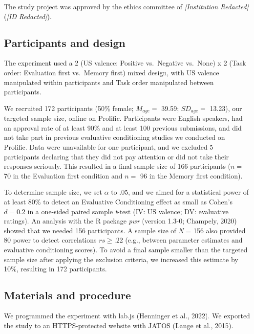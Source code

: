 \documentclass[
  man,floatsintext]{apa6}
\begin{document}
The study project was approved by the ethics committee of \emph{{[}Institution Redacted{]}} (\emph{{[}ID Redacted{]}}).

\hypertarget{participants-and-design}{%
\subsection{Participants and design}\label{participants-and-design}}

The experiment used a 2 (US valence: Positive vs.~Negative vs.~None) x 2 (Task order: Evaluation first vs.~Memory first) mixed design, with US valence manipulated within participants and Task order manipulated between participants.

We recruited 172 participants (50\(\%\) female; \(M_{age} =\) 39.59; \(SD_{age} =\) 13.23), our targeted sample size, online on Prolific. Participants were English speakers, had an approval rate of at least 90\% and at least 100 previous submissions, and did not take part in previous evaluative conditioning studies we conducted on Prolific. Data were unavailable for one participant, and we excluded 5 participants declaring that they did not pay attention or did not take their responses seriously. This resulted in a final sample size of 166 participants (\(n =\) 70 in the Evaluation first condition and \(n =\) 96 in the Memory first condition).

To determine sample size, we set \(\alpha\) to .05, and we aimed for a statistical power of at least \(80\%\) to detect an Evaluative Conditioning effect as small as Cohen's \(d = 0.2\) in a one-sided paired sample \emph{t}-test (IV: US valence; DV: evaluative ratings). An analysis with the R package \emph{pwr} (version 1.3-0; Champely, 2020) showed that we needed 156 participants. A sample size of \emph{N} = 156 also provided \(80%
\) power to detect correlations \(rs \geq .22\) (e.g., between parameter estimates and evaluative conditioning scores). To avoid a final sample smaller than the targeted sample size after applying the exclusion criteria, we increased this estimate by 10\%, resulting in 172 participants.

\hypertarget{materials-and-procedure}{%
\subsection{Materials and procedure}\label{materials-and-procedure}}

We programmed the experiment with lab.js (Henninger et al., 2022). We exported the study to an HTTPS-protected website with JATOS (Lange et al., 2015).
\end{document}
